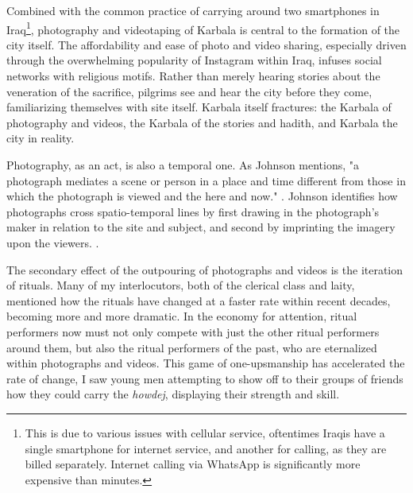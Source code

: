 Combined with the common practice of carrying around two smartphones in Iraq\footnote{This is due to various issues with cellular service, oftentimes Iraqis have a single smartphone for internet service, and another for calling, as they are billed separately. Internet calling via WhatsApp is significantly more expensive than minutes.}, photography and videotaping of Karbala is central to the formation of the city itself. The affordability and ease of photo and video sharing, especially driven through the overwhelming popularity of Instagram within Iraq, infuses social networks with religious motifs. Rather than merely hearing stories about the veneration of the sacrifice, pilgrims see and hear the city before they come, familiarizing themselves with site itself. Karbala itself fractures: the Karbala of photography and videos, the Karbala of the stories and hadith, and Karbala the city in reality.

Photography, as an act, is also a temporal one. As Johnson mentions, "a photograph mediates a scene or person in a place and time different from those in which the photograph is viewed and the here and now." \cite[92]{johnson_automatic_2020}. Johnson identifies how photographs cross spatio-temporal lines by first drawing in the photograph's maker in relation to the site and subject, and second by imprinting the imagery upon the viewers. \cite[92]{johnson_automatic_2020}. 

The secondary effect of the outpouring of photographs and videos is the iteration of rituals. Many of my interlocutors, both of the clerical class and laity, mentioned how the rituals have changed at a faster rate within recent decades, becoming more and more dramatic. In the economy for attention, ritual performers now must not only compete with just the other ritual performers around them, but also the ritual performers of the past, who are eternalized within photographs and videos. This game of one-upsmanship has accelerated the rate of change, I saw young men attempting to show off to their groups of friends how they could carry the \emph{howdej}, displaying their strength and skill. 

